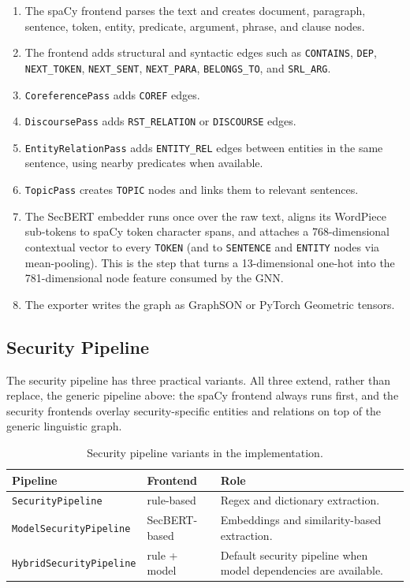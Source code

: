 \documentclass[11pt]{article}
\begin{document}
\begin{enumerate}
    \item The spaCy frontend parses the text and creates document, paragraph,
    sentence, token, entity, predicate, argument, phrase, and clause nodes.
    \item The frontend adds structural and syntactic edges such as
    \texttt{CONTAINS}, \texttt{DEP}, \texttt{NEXT\_TOKEN},
    \texttt{NEXT\_SENT}, \texttt{NEXT\_PARA}, \texttt{BELONGS\_TO}, and
    \texttt{SRL\_ARG}.
    \item \texttt{CoreferencePass} adds \texttt{COREF} edges.
    \item \texttt{DiscoursePass} adds \texttt{RST\_RELATION} or
    \texttt{DISCOURSE} edges.
    \item \texttt{EntityRelationPass} adds \texttt{ENTITY\_REL} edges between
    entities in the same sentence, using nearby predicates when available.
    \item \texttt{TopicPass} creates \texttt{TOPIC} nodes and links them to
    relevant sentences.
    \item The SecBERT embedder runs once over the raw text, aligns its
    WordPiece sub-tokens to spaCy token character spans, and attaches a
    768-dimensional contextual vector to every \texttt{TOKEN} (and to
    \texttt{SENTENCE} and \texttt{ENTITY} nodes via mean-pooling). This is the
    step that turns a 13-dimensional one-hot into the 781-dimensional node
    feature consumed by the GNN.
    \item The exporter writes the graph as GraphSON or PyTorch Geometric
    tensors.
\end{enumerate}

\subsection{Security Pipeline}

The security pipeline has three practical variants. All three extend, rather
than replace, the generic pipeline above: the spaCy frontend always runs
first, and the security frontends overlay security-specific entities and
relations on top of the generic linguistic graph.

\begin{table}[h]
\centering
\small
\begin{tabular}{lll}
\toprule
Pipeline & Frontend & Role \\
\midrule
\texttt{SecurityPipeline} & rule-based & Regex and dictionary extraction. \\
\texttt{ModelSecurityPipeline} & SecBERT-based & Embeddings and similarity-based extraction. \\
\texttt{HybridSecurityPipeline} & rule + model & Default security pipeline when model dependencies are available. \\
\bottomrule
\end{tabular}
\caption{Security pipeline variants in the implementation.}
\end{table}
\end{document}
